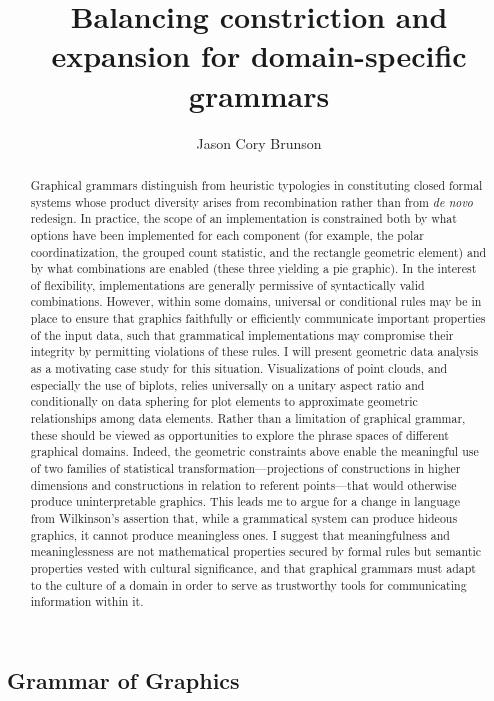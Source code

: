 \documentclass[
]{article}
\title{Balancing constriction and expansion for domain-specific
grammars}
\author{Jason Cory Brunson}
\date{}
\begin{document}
\maketitle
\begin{abstract}
Graphical grammars distinguish from heuristic typologies in constituting
closed formal systems whose product diversity arises from recombination
rather than from \emph{de novo} redesign. In practice, the scope of an
implementation is constrained both by what options have been implemented
for each component (for example, the polar coordinatization, the grouped
count statistic, and the rectangle geometric element) and by what
combinations are enabled (these three yielding a pie graphic). In the
interest of flexibility, implementations are generally permissive of
syntactically valid combinations. However, within some domains,
universal or conditional rules may be in place to ensure that graphics
faithfully or efficiently communicate important properties of the input
data, such that grammatical implementations may compromise their
integrity by permitting violations of these rules. I will present
geometric data analysis as a motivating case study for this situation.
Visualizations of point clouds, and especially the use of biplots,
relies universally on a unitary aspect ratio and conditionally on data
sphering for plot elements to approximate geometric relationships among
data elements. Rather than a limitation of graphical grammar, these
should be viewed as opportunities to explore the phrase spaces of
different graphical domains. Indeed, the geometric constraints above
enable the meaningful use of two families of statistical
transformation---projections of constructions in higher dimensions and
constructions in relation to referent points---that would otherwise
produce uninterpretable graphics. This leads me to argue for a change in
language from Wilkinson's assertion that, while a grammatical system can
produce hideous graphics, it cannot produce meaningless ones. I suggest
that meaningfulness and meaninglessness are not mathematical properties
secured by formal rules but semantic properties vested with cultural
significance, and that graphical grammars must adapt to the culture of a
domain in order to serve as trustworthy tools for communicating
information within it.
\end{abstract}

\pagebreak

\subsection{Grammar of Graphics}\label{grammar-of-graphics}
\end{document}
